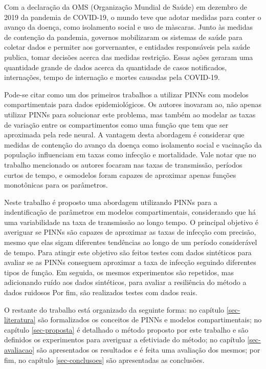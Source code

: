Com a declaração da OMS (Organização Mundial de Saúde) em dezembro de 2019 da
pandemia de COVID-19, o mundo teve que adotar medidas para conter o avanço da 
doença, como isolamento social e uso de màscaras. Junto às medidas de contenção
da pandemia, governos mobilizaram os sistemas de saúde para coletar dados
e permiter aos gorvernantes, e entidades responsáveis pela saúde publica, 
tomar decisões acerca das medidas restrição.  
Essas ações geraram uma quantidade grande de dados acerca da quantidade de casos
notificados, internações, tempo de internação e mortes causadas pela COVID-19. 

Pode-se citar \cite{long-etal:21-L2} como um dos primeiros trabalhos a utilizar
PINNs com modelos compartimentais para dados epidemiológicos. Os autores inovaram 
ao, não apenas utilizar PINNs para solucionar este problema, mas também ao modelar 
as taxas de variação entre os compartimentos como uma função que tem que ser
aproximada pela rede neural. A vantagem desta abordagem é considerar que medidas
de contenção do avanço da doença como isolamento social e vacinação da população
influenciam em taxas como infecção e mortalidade. Vale notar que no trabalho
mencionado os autores focaram nas taxas de transmissão, períodos curtos de tempo,
e osmodelos foram capazes de aproximar apenas funções monotônicas para os parâmetros.   

Neste trabalho é proposto uma abordagem utilizando PINNs para a indentificação 
de parâmetros em modelos compartimentais, considerando que há uma variabilidade
na taxa de transmissão ao longo tempo. O principal objetivo é averiguar se PINNs
são capazes de aproximar as taxas de infecção com precisão, mesmo que elas  
sigam diferentes tendências ao longo de um período considerável de tempo.
Para atingir este objetivo são feitos testes com dados sintéticos para avaliar
se as PINNs conseguem aproximar a taxa de infecção seguindo diferentes tipos de
função. 
Em seguida, os mesmos experimentos são repetidos, mas adicionando ruído aos
dados sintéticos, para avaliar a resiliência do método a dados ruidosos
Por fim, são realizados testes com dados reais.

O restante do trabalho está organizado da seguinte forma: no capítulo \ref{sec-literatura} 
são formalizados os conceitos de PINNs e modelos compartimentais; 
no capítulo \ref{sec-proposta} é detalhado o método proposto por este 
trabalho e são definidos os experimentos para averiguar a efetiviade
do método; no capítulo \ref{sec-avaliacao} são apresentados os resultados e 
é feita uma avaliação dos mesmos; por fim, no capítulo \ref{sec-conclusoes} são
apresentadas as conclusões.    